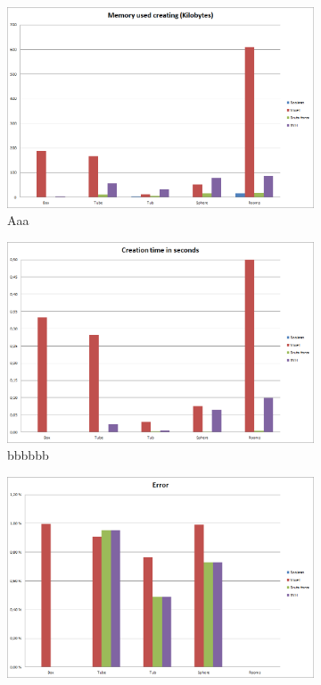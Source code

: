 \documentclass[11pt,twoside,a4paper]{report}
\begin{document}
\begin{figure}[h] \centering 
	\begin{subfigure}[h]{0.49\textwidth}
	\includegraphics[width=\textwidth]{images/chart_comparison_creation_memory}
	\caption{Aaa} \label{fig:gull} \end{subfigure}
    \begin{subfigure}[h]{0.49\textwidth}
	\includegraphics[width=\textwidth]{images/chart_comparison_creation_time}
    \caption{bbbbbb} \label{fig:tiger} \end{subfigure}
	\begin{subfigure}[h]{0.49\textwidth} 
	\includegraphics[width=\textwidth]{images/chart_comparison_error}

\end{subfigure}
\end{figure}
\end{document}
